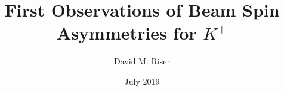\title{First Observations of Beam Spin Asymmetries for $K^+$}
\author{David M. Riser}
\date{July 2019}

